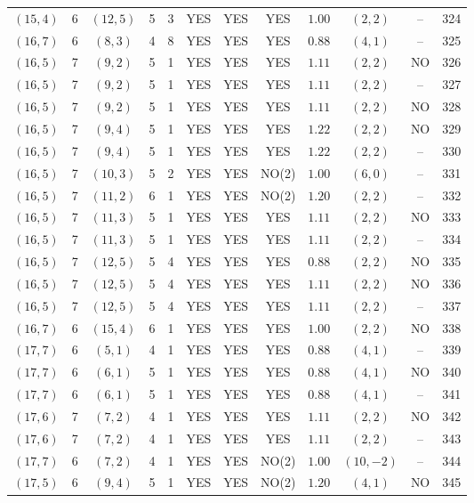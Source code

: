 \begin{longtable}{|c|c|c|c|c|c|c|c|c|c|c|c|}
$(15,4)$ & 6 & $(12,5)$ & 5 & 3 & YES & YES & YES & $1.00$ & $(2,2)$ & -- & 324\\
$(16,7)$ & 6 & $(8,3)$ & 4 & 8 & YES & YES & YES & $0.88$ & $(4,1)$ & -- & 325\\
$(16,5)$ & 7 & $(9,2)$ & 5 & 1 & YES & YES & YES & $1.11$ & $(2,2)$ & NO & 326\\
$(16,5)$ & 7 & $(9,2)$ & 5 & 1 & YES & YES & YES & $1.11$ & $(2,2)$ & -- & 327\\
$(16,5)$ & 7 & $(9,2)$ & 5 & 1 & YES & YES & YES & $1.11$ & $(2,2)$ & NO & 328\\
$(16,5)$ & 7 & $(9,4)$ & 5 & 1 & YES & YES & YES & $1.22$ & $(2,2)$ & NO & 329\\
$(16,5)$ & 7 & $(9,4)$ & 5 & 1 & YES & YES & YES & $1.22$ & $(2,2)$ & -- & 330\\
$(16,5)$ & 7 & $(10,3)$ & 5 & 2 & YES & YES & NO(2) & $1.00$ & $(6,0)$ & -- & 331\\
$(16,5)$ & 7 & $(11,2)$ & 6 & 1 & YES & YES & NO(2) & $1.20$ & $(2,2)$ & -- & 332\\
$(16,5)$ & 7 & $(11,3)$ & 5 & 1 & YES & YES & YES & $1.11$ & $(2,2)$ & NO & 333\\
$(16,5)$ & 7 & $(11,3)$ & 5 & 1 & YES & YES & YES & $1.11$ & $(2,2)$ & -- & 334\\
$(16,5)$ & 7 & $(12,5)$ & 5 & 4 & YES & YES & YES & $0.88$ & $(2,2)$ & NO & 335\\
$(16,5)$ & 7 & $(12,5)$ & 5 & 4 & YES & YES & YES & $1.11$ & $(2,2)$ & NO & 336\\
$(16,5)$ & 7 & $(12,5)$ & 5 & 4 & YES & YES & YES & $1.11$ & $(2,2)$ & -- & 337\\
$(16,7)$ & 6 & $(15,4)$ & 6 & 1 & YES & YES & YES & $1.00$ & $(2,2)$ & NO & 338\\
$(17,7)$ & 6 & $(5,1)$ & 4 & 1 & YES & YES & YES & $0.88$ & $(4,1)$ & -- & 339\\
$(17,7)$ & 6 & $(6,1)$ & 5 & 1 & YES & YES & YES & $0.88$ & $(4,1)$ & NO & 340\\
$(17,7)$ & 6 & $(6,1)$ & 5 & 1 & YES & YES & YES & $0.88$ & $(4,1)$ & -- & 341\\
$(17,6)$ & 7 & $(7,2)$ & 4 & 1 & YES & YES & YES & $1.11$ & $(2,2)$ & NO & 342\\
$(17,6)$ & 7 & $(7,2)$ & 4 & 1 & YES & YES & YES & $1.11$ & $(2,2)$ & -- & 343\\
$(17,7)$ & 6 & $(7,2)$ & 4 & 1 & YES & YES & NO(2) & $1.00$ & $(10,-2)$ & -- & 344\\
$(17,5)$ & 6 & $(9,4)$ & 5 & 1 & YES & YES & NO(2) & $1.20$ & $(4,1)$ & NO & 345\\

\end{longtable}
